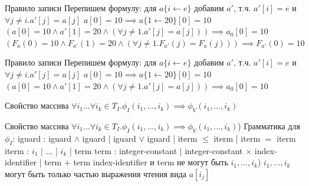 \documentclass{beamer}
\begin{document}
\begin{frame}{Правило записи}
Перепишем формулу:\newline
для $a\{i\leftarrow e\}$ добавим $a'$, т.ч. $a'[i] = e$ и $\forall j\ne i. a'[j] = a[j]$\newline
$a[0] = 10 \implies a\{1 \leftarrow 20\}[0] = 10$\newline
$(a[0] = 10 \wedge a'[1] = 20 \wedge (\forall j \ne 1. a'[j] = a[j])) \implies a_0[0] = 10$\newline
$(F_a(0) = 10 \wedge F_{a'}(1) = 20 \wedge (\forall j \ne 1. F_{a'}(j) = F_a(j))) \implies F_{a'}(0) = 10$\newline
\end{frame}

\begin{frame}{Правило записи}
Перепишем формулу:\newline
для $a\{i\leftarrow e\}$ добавим $a'$, т.ч. $a'[i] = e$ и $\forall j\ne i. a'[j] = a[j]$\newline
$a[0] = 10 \implies a\{1 \leftarrow 20\}[0] = 10$\newline
$(a[0] = 10 \wedge a'[1] = 20 \wedge (\forall j \ne 1. a'[j] = a[j])) \implies a_0[0] = 10$\newline
\end{frame}

\begin{frame}{Свойство массива}
$\forall i_1 \dots \forall i_k \in T_I. \phi_I(i_1, \dots, i_k) \implies \phi_V(i_1, \dots, i_k)$\newline
\end{frame}

\begin{frame}{Свойство массива}
$\forall i_1 \dots \forall i_k \in T_I. \phi_I(i_1, \dots, i_k) \implies \phi_V(i_1, \dots, i_k)$) Грамматика для $\phi_I$:\newline
iguard : iguard $\wedge$ iguard | iguard $\vee$ iguard | iterm $\le$ iterm | iterm $=$ iterm\newline
iterm : $i_1$ | $\dots$ | $i_k$ | term\newline
term : integer-constant | integer-constant $\times$ index-identifier | term $+$ term\newline
index-identifier и term не могут быть $i_1, \dots, i_k$) $i_1, \dots, i_k$ могут быть только частью выражения чтения вида $a[i_j]$\newline
\end{frame}
\end{document}
